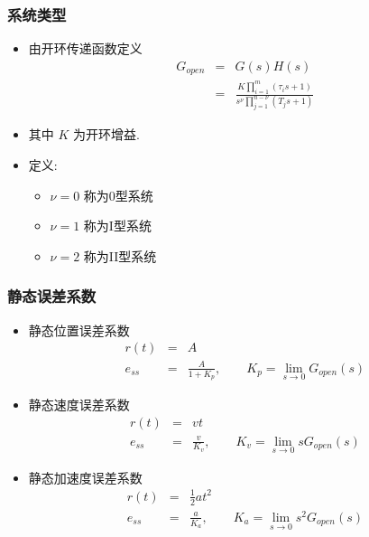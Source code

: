 \documentclass{article}
\begin{document}
\begin{frame}
\frametitle{系统类型}
\label{sec-3-2-4}

\begin{itemize}
\item <2->由开环传递函数定义
      \begin{eqnarray*}
       G_{open} & = & G(s)H(s) \\
	       	& = & \frac{K\prod_{i=1}^{m}(\tau_{i}s+1)}{s^{\nu}\prod_{j=1}^{n-\nu}(T_{j}s+1)}
      \end{eqnarray*}
\item <2->其中 $K$ 为开环增益.
\item <3->定义:
\begin{itemize}
\item $\nu=0$ 称为0型系统
\item $\nu=1$ 称为I型系统
\item $\nu=2$ 称为II型系统
\end{itemize}
\end{itemize}
\end{frame}
\begin{frame}
\frametitle{静态误差系数}
\label{sec-3-2-5}

\begin{itemize}
\item <2->静态位置误差系数
       	\begin{eqnarray*}
       	r(t) &=& A\\
       	e_{ss}&=&\frac{A}{1+K_{p}}, \qquad
       	K_{p}=\lim_{s\rightarrow 0} G_{open}(s)
       	\end{eqnarray*}
\item <3->静态速度误差系数 
       	\begin{eqnarray*}
       	r(t)&=&vt\\
       	e_{ss}&=&\frac{v}{K_{v}}, \qquad
       	K_{v}=\lim_{s\rightarrow 0} sG_{open}(s)
       	\end{eqnarray*}
\item <4->静态加速度误差系数 
       	\begin{eqnarray*}
       	r(t)&=&\frac{1}{2}at^{2}\\
       	e_{ss}&=&\frac{a}{K_{a}}, \qquad
       	K_{a}=\lim_{s\rightarrow 0} s^{2}G_{open}(s)
       	\end{eqnarray*}
\end{itemize}
\end{frame}
\end{document}
